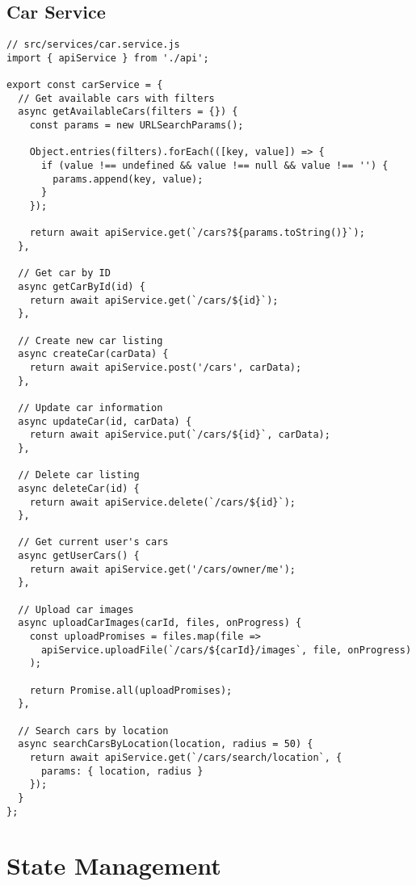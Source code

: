 \documentclass[12pt,a4paper]{article}
\begin{document}
\subsection{Car Service}
\begin{lstlisting}[caption=Car Service Functions]
// src/services/car.service.js
import { apiService } from './api';

export const carService = {
  // Get available cars with filters
  async getAvailableCars(filters = {}) {
    const params = new URLSearchParams();
    
    Object.entries(filters).forEach(([key, value]) => {
      if (value !== undefined && value !== null && value !== '') {
        params.append(key, value);
      }
    });

    return await apiService.get(`/cars?${params.toString()}`);
  },

  // Get car by ID
  async getCarById(id) {
    return await apiService.get(`/cars/${id}`);
  },

  // Create new car listing
  async createCar(carData) {
    return await apiService.post('/cars', carData);
  },

  // Update car information
  async updateCar(id, carData) {
    return await apiService.put(`/cars/${id}`, carData);
  },

  // Delete car listing
  async deleteCar(id) {
    return await apiService.delete(`/cars/${id}`);
  },

  // Get current user's cars
  async getUserCars() {
    return await apiService.get('/cars/owner/me');
  },

  // Upload car images
  async uploadCarImages(carId, files, onProgress) {
    const uploadPromises = files.map(file => 
      apiService.uploadFile(`/cars/${carId}/images`, file, onProgress)
    );
    
    return Promise.all(uploadPromises);
  },

  // Search cars by location
  async searchCarsByLocation(location, radius = 50) {
    return await apiService.get(`/cars/search/location`, {
      params: { location, radius }
    });
  }
};
\end{lstlisting}

\section{State Management}
\end{document}
